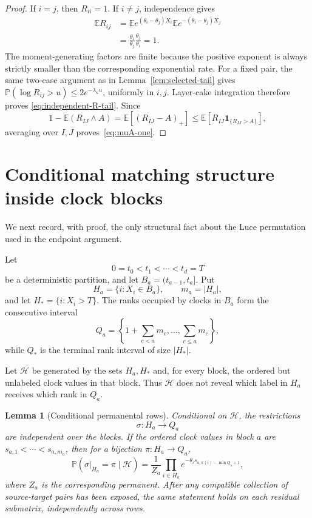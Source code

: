 \documentclass[11pt]{article}
\newcommand{\E}{\mathbb E}
\newcommand{\Pp}{\mathbb P}
\newcommand{\1}{\mathbf 1}
\newcommand{\cH}{\mathcal H}
\newtheorem{lemma}[theorem]{Lemma}
\theoremstyle{definition}
\theoremstyle{remark}
\begin{document}
\begin{proof}
If $i=j$, then $R_{ii}=1$.  If $i\ne j$, independence gives
\begin{align*}
 \E R_{ij}
 &=\E e^{(\theta_i-\theta_j)X_i}
   \E e^{-(\theta_i-\theta_j)X_j}\\
 &=\frac{\theta_i}{\theta_j}\frac{\theta_j}{\theta_i}=1.
\end{align*}
The moment-generating factors are finite because the positive exponent
is always strictly smaller than the corresponding exponential rate.
For a fixed pair, the same two-case argument as in
Lemma~\ref{lem:selected-tail} gives
$\Pp(\log R_{ij}>u)\leq2e^{-\lambda_\kappa u}$, uniformly in
$i,j$.  Layer-cake integration therefore proves
\eqref{eq:independent-R-tail}.  Since
\[
  1-\E(R_{IJ}\wedge A)
  =\E[(R_{IJ}-A)_+]
  \leq \E[R_{IJ}\1_{\{R_{IJ}>A\}}],
\]
averaging over $I,J$ proves~\eqref{eq:muA-one}.
\end{proof}

\section{Conditional matching structure inside clock blocks}
\label{sec:block-structure}

We next record, with proof, the only structural fact about the Luce
permutation used in the endpoint argument.

Let
\[
  0=t_0<t_1<\cdots<t_d=T
\]
be a deterministic partition, and let $B_a=(t_{a-1},t_a]$.  Put
\[
 H_a=\{i:X_i\in B_a\},\qquad m_a=|H_a|,
\]
and let $H_*=\{i:X_i>T\}$.  The ranks occupied by clocks in $B_a$ form
the consecutive interval
\[
 Q_a=\left\{1+\sum_{c<a}m_c,\dots,\sum_{c\leq a}m_c\right\},
\]
while $Q_*$ is the terminal rank interval of size $|H_*|$.

Let $\cH$ be generated by the sets $H_a,H_*$ and, for every block, the
ordered but unlabeled clock values in that block.  Thus $\cH$ does not
reveal which label in $H_a$ receives which rank in $Q_a$.

\begin{lemma}[Conditional permanental rows]
\label{lem:permanental-rows}
Conditional on $\cH$, the restrictions
\[
  \sigma:H_a\longrightarrow Q_a
\]
are independent over the blocks.  If the ordered clock values in block
$a$ are $s_{a,1}<\cdots<s_{a,m_a}$, then for a bijection
$\pi:H_a\to Q_a$,
\begin{equation}\label{eq:row-law}
 \Pp(\sigma|_{H_a}=\pi\mid\cH)
 =\frac{1}{Z_a}
 \prod_{i\in H_a}e^{-\theta_i s_{a,\pi(i)-\min Q_a+1}},
\end{equation}
where $Z_a$ is the corresponding permanent.  After any compatible
collection of source-target pairs has been exposed, the same statement
holds on each residual submatrix, independently across rows.
\end{lemma}
\end{document}
